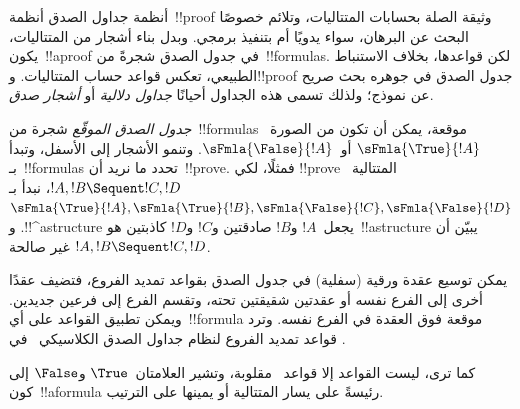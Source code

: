 \documentclass[../../../include/open-logic-section]{subfiles}
\begin{document}


أنظمة جداول الصدق أنظمة~!!{proof} وثيقة الصلة بحسابات المتتاليات، وتلائم
خصوصًا البحث عن البرهان، سواء يدويًا أم بتنفيذ برمجي. وبدل بناء أشجار من
المتتاليات، يكون~!!a{proof} في جدول الصدق شجرةً من~!!{formula}s. لكن
قواعدها، بخلاف الاستنباط الطبيعي، تعكس قواعد حساب المتتاليات. و!!{proof}
جدول الصدق في جوهره بحث صريح عن نموذج؛ ولذلك تسمى هذه الجداول أحيانًا
\emph{جداول دلالية} أو \emph{أشجار صدق}.

\emph{جدول الصدق الموقّع} شجرة من~!!{formula}s موقعة، يمكن أن تكون من
الصورة~$\sFmla{\True}{!A}$ أو~$\sFmla{\False}{!A}$. وتنمو الأشجار إلى
الأسفل، وتبدأ بـ~!!{formula}s تحدد ما نريد أن~!!{prove}. فمثلًا، لكي
!!{prove} المتتالية~$!A,!B\Sequent !C,!D$، نبدأ بـ
$\sFmla{\True}{!A},\sFmla{\True}{!B},
\sFmla{\False}{!C},\sFmla{\False}{!D}$. و!!^a{structure} يجعل~$!A$ و$!B$
صادقتين و$!C$ و$!D$ كاذبتين هو~!!a{structure} يبيّن أن
$!A,!B\Sequent !C,!D$ غير صالحة.

يمكن توسيع عقدة ورقية (سفلية) في جدول الصدق بقواعد تمديد الفروع، فتضيف
عقدًا أخرى إلى الفرع نفسه أو عقدتين شقيقتين تحته، وتقسم الفرع إلى فرعين
جديدين. ويمكن تطبيق القواعد على أي~!!{formula} موقعة فوق العقدة في الفرع
نفسه. وترد قواعد تمديد الفروع لنظام جداول الصدق الكلاسيكي~ في
.



كما ترى، ليست القواعد إلا قواعد~ مقلوبة، وتشير العلامتان~$\True$
و$\False$ إلى كون~!!a{formula} رئيسةً على يسار المتتالية أو يمينها على
الترتيب.
\end{document}
